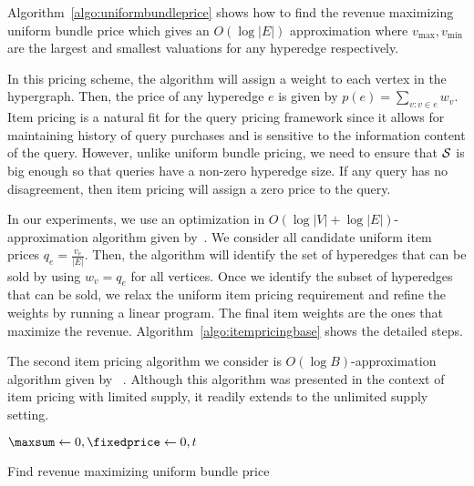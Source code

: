 Algorithm~\ref{algo:uniformbundleprice} shows how to find the revenue maximizing uniform bundle price which gives an $O(\log |E|)$ approximation where $v_{\max}, v_{\min}$ are the largest and smallest valuations for any hyperedge respectively.

\smallskip
{} In this pricing scheme, the algorithm will assign a weight to each vertex in the hypergraph. Then, the price of any hyperedge $e$ is given by $p(e) = \sum_{v : v \in e} w_v$. Item pricing is a natural fit for the query pricing framework since it allows for maintaining history of query purchases and is sensitive to the information content of the query. However, unlike uniform bundle pricing, we need to ensure that $\mathcal{S}$ is big enough so that queries have a non-zero hyperedge size. If any query has no disagreement, then item pricing will assign a zero price to the query.

In our experiments, we use an optimization in $O(\log |V| + \log |E|)$-approximation algorithm given by~\cite{guruswami2005profit}. We consider all candidate uniform item prices $q_e = \frac{v_e}{|E|}$. Then, the algorithm will identify the set of hyperedges that can be sold by using $w_v = q_e$ for all vertices. Once we identify the subset of hyperedges that can be sold, we relax the uniform item pricing requirement and refine the weights by running a linear program. The final item weights are the ones that maximize the revenue. Algorithm~\ref{algo:itempricingbase} shows the detailed steps.

The second item pricing algorithm we consider is $O(\log B)$-approximation algorithm given by ~\cite{}. Although this algorithm was presented in the context of item pricing with limited supply, it readily extends to the unlimited supply setting.

\begin{algorithm}[!htp]
	\DontPrintSemicolon 
	\BlankLine
	$\maxsum \leftarrow 0, \fixedprice \leftarrow 0, t$ \\
	\caption{Find revenue maximizing uniform bundle price}
	\label{algo:itempricingbase}
\end{algorithm}

